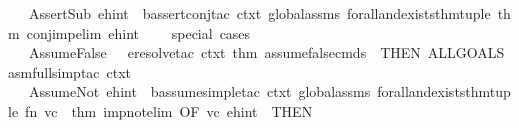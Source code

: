 \begin{isabellebody}
\ \ {\isacharbar}{\kern0pt}\ {\isacharparenleft}{\kern0pt}AssertSub{\isacharcomma}{\kern0pt}\ ehint{\isacharparenright}{\kern0pt}\ {\isacharequal}{\kern0pt}{\isachargreater}{\kern0pt}\ b{\isacharunderscore}{\kern0pt}assert{\isacharunderscore}{\kern0pt}conj{\isacharunderscore}{\kern0pt}tac\ ctxt\ global{\isacharunderscore}{\kern0pt}assms\ forall{\isacharunderscore}{\kern0pt}and{\isacharunderscore}{\kern0pt}exists{\isacharunderscore}{\kern0pt}thm{\isacharunderscore}{\kern0pt}tuple\ {\isacharparenleft}{\kern0pt}{\isacharat}{\kern0pt}{\isacharbraceleft}{\kern0pt}thm\ conj{\isacharunderscore}{\kern0pt}imp{\isacharunderscore}{\kern0pt}elim{\isacharbraceright}{\kern0pt}{\isacharparenright}{\kern0pt}\ ehint\ \isanewline
\ \ {\isacharparenleft}{\kern0pt}{\isacharasterisk}{\kern0pt}\ special\ cases\ {\isacharasterisk}{\kern0pt}{\isacharparenright}{\kern0pt}\isanewline
\ \ {\isacharbar}{\kern0pt}\ {\isacharparenleft}{\kern0pt}AssumeFalse{\isacharcomma}{\kern0pt}\ {\isacharunderscore}{\kern0pt}{\isacharparenright}{\kern0pt}\ {\isacharequal}{\kern0pt}{\isachargreater}{\kern0pt}\ {\isacharparenleft}{\kern0pt}eresolve{\isacharunderscore}{\kern0pt}tac\ ctxt\ {\isacharbrackleft}{\kern0pt}{\isacharat}{\kern0pt}{\isacharbraceleft}{\kern0pt}thm\ assume{\isacharunderscore}{\kern0pt}false{\isacharunderscore}{\kern0pt}cmds{\isacharbraceright}{\kern0pt}{\isacharbrackright}{\kern0pt}\ {}{\isacharparenright}{\kern0pt}\ THEN\ {\isacharparenleft}{\kern0pt}ALLGOALS\ {\isacharparenleft}{\kern0pt}asm{\isacharunderscore}{\kern0pt}full{\isacharunderscore}{\kern0pt}simp{\isacharunderscore}{\kern0pt}tac\ ctxt{\isacharparenright}{\kern0pt}{\isacharparenright}{\kern0pt}\isanewline
\ \ {\isacharbar}{\kern0pt}\ {\isacharparenleft}{\kern0pt}AssumeNot{\isacharcomma}{\kern0pt}\ ehint{\isacharparenright}{\kern0pt}\ {\isacharequal}{\kern0pt}{\isachargreater}{\kern0pt}\ b{\isacharunderscore}{\kern0pt}assume{\isacharunderscore}{\kern0pt}simple{\isacharunderscore}{\kern0pt}tac\ ctxt\ global{\isacharunderscore}{\kern0pt}assms\ forall{\isacharunderscore}{\kern0pt}and{\isacharunderscore}{\kern0pt}exists{\isacharunderscore}{\kern0pt}thm{\isacharunderscore}{\kern0pt}tuple\ {\isacharparenleft}{\kern0pt}fn\ {\isacharparenleft}{\kern0pt}vc{\isacharparenright}{\kern0pt}\ {\isacharequal}{\kern0pt}{\isachargreater}{\kern0pt}\ {\isacharat}{\kern0pt}{\isacharbraceleft}{\kern0pt}thm\ imp{\isacharunderscore}{\kern0pt}not{\isacharunderscore}{\kern0pt}elim{\isacharbraceright}{\kern0pt}\ OF\ {\isacharbrackleft}{\kern0pt}vc{\isacharbrackright}{\kern0pt}{\isacharparenright}{\kern0pt}\ ehint\ {}\ THEN\ \isanewline

\end{isabellebody}
